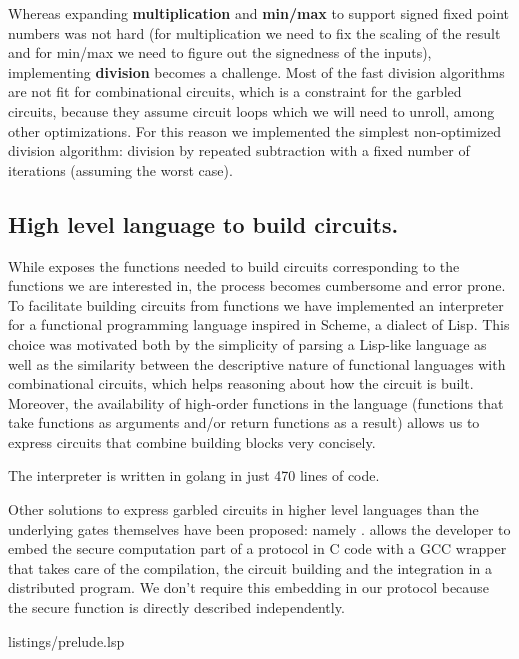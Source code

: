 Whereas expanding \textbf{multiplication} and \textbf{min/max} to support
signed fixed point numbers was not hard (for multiplication we need to fix the
scaling of the result and for min/max we need to figure out the signedness of
the inputs), implementing \textbf{division} becomes a challenge.  Most of the
fast division algorithms are not fit for combinational circuits, which is a
constraint for the garbled circuits, because they assume circuit loops which we
will need to unroll, among other optimizations.  For this reason we implemented
the simplest non-optimized division algorithm: division by repeated subtraction
with a fixed number of iterations (assuming the worst case).

\subsection{High level language to build circuits.}

While \libgarble{} exposes the functions needed to build circuits corresponding
to the functions we are interested in, the process becomes cumbersome and error
prone.  To facilitate building circuits from functions we have implemented an
interpreter for a functional programming language inspired in Scheme, a dialect
of Lisp.  This choice was motivated both by the simplicity of parsing a
Lisp-like language as well as the similarity between the descriptive nature of
functional languages with combinational circuits, which helps reasoning about
how the circuit is built.  Moreover, the availability of high-order functions
in the language (functions that take functions as arguments and/or return
functions as a result) allows us to express circuits that combine building
blocks very concisely.

The interpreter is written in golang in just 470 lines of code.

Other solutions to express garbled circuits in higher level languages than the
underlying gates themselves have been proposed: namely \OblivC{}.  \OblivC{}
allows the developer to embed the secure computation part of a protocol in C
code with a GCC wrapper that takes care of the compilation, the circuit
building and the integration in a distributed program.  We don't require this
embedding in our protocol because the secure function is directly described
independently.



{listings/prelude.lsp}

